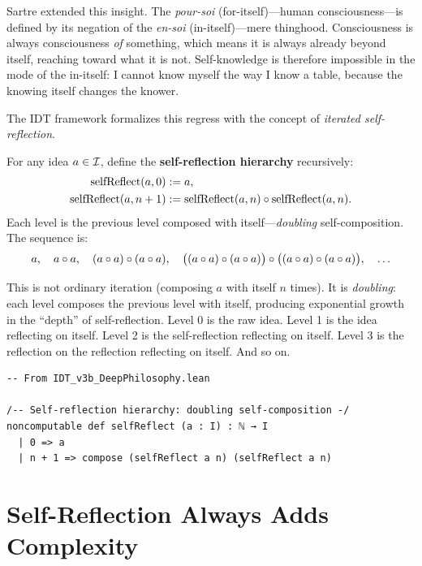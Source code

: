 Sartre extended this insight.  The \emph{pour-soi} (for-itself)---human
consciousness---is defined by its negation of the \emph{en-soi}
(in-itself)---mere thinghood.  Consciousness is always consciousness
\emph{of} something, which means it is always already beyond itself, reaching
toward what it is not.  Self-knowledge is therefore impossible in the mode of
the in-itself: I cannot know myself the way I know a table, because the knowing
itself changes the knower.

The IDT framework formalizes this regress with the concept of \emph{iterated
self-reflection}.

\begin{definition}
\label{def:self-reflect}
For any idea $a \in \mathcal{I}$, define the \textbf{self-reflection hierarchy}
recursively:
\begin{align*}
\mathrm{selfReflect}(a, 0) &:= a, \\
\mathrm{selfReflect}(a, n+1) &:= \mathrm{selfReflect}(a, n) \circ
  \mathrm{selfReflect}(a, n).
\end{align*}
Each level is the previous level composed with itself---\emph{doubling}
self-composition.  The sequence is:
\[
a, \quad a \circ a, \quad (a \circ a) \circ (a \circ a), \quad
\bigl((a \circ a) \circ (a \circ a)\bigr) \circ
\bigl((a \circ a) \circ (a \circ a)\bigr), \quad \ldots
\]
\end{definition}

This is not ordinary iteration (composing $a$ with itself $n$ times).  It is
\emph{doubling}: each level composes the previous level with itself, producing
exponential growth in the ``depth'' of self-reflection.  Level 0 is the raw
idea.  Level 1 is the idea reflecting on itself.  Level 2 is the
self-reflection reflecting on itself.  Level 3 is the reflection on the
reflection reflecting on itself.  And so on.

\begin{lstlisting}
-- From IDT_v3b_DeepPhilosophy.lean

/-- Self-reflection hierarchy: doubling self-composition -/
noncomputable def selfReflect (a : I) : ℕ → I
  | 0 => a
  | n + 1 => compose (selfReflect a n) (selfReflect a n)
\end{lstlisting}

\section{Self-Reflection Always Adds Complexity}

